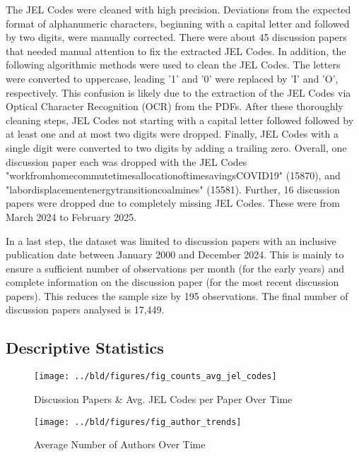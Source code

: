 \documentclass[11pt, a4paper, leqno]{article}
\begin{document}
The JEL Codes were cleaned with high precision.
Deviations from the expected format of alphanumeric characters, beginning with a capital letter and followed by two digits, were manually corrected.
There were about 45 discussion papers that needed manual attention to fix the extracted JEL Codes.
In addition, the following algorithmic methods were used to clean the JEL Codes.
The letters were converted to uppercase, leading '1' and '0' were replaced by 'I' and 'O', respectively.
This confusion is likely due to the extraction of the JEL Codes via Optical Character Recognition (OCR) from the PDFs.
After these thoroughly cleaning steps, JEL Codes not starting with a capital letter followed followed by at least one and at most two digits were dropped.
Finally, JEL Codes with a single digit were converted to two digits by adding a trailing zero.
Overall, one discussion paper each was dropped with the JEL Codes "workfromhomecommutetimesallocationoftimesavingsCOVID19" (15870), and
"labordisplacementenergytransitioncoalmines" (15581).
Further, 16 discussion papers were dropped due to completely missing JEL Codes. These were from March 2024 to February 2025.

In a last step, the dataset was limited to discussion papers with an inclusive publication date between January 2000 and December 2024.
This is mainly to ensure a sufficient number of observations per month (for the early years) and complete information on the discussion paper (for the most recent discussion papers).
This reduces the sample size by 195 observations. The final number of discussion papers analysed is 17,449.

\subsection{Descriptive Statistics}

\begin{figure}
    \centering
    \texttt{[image: ../bld/figures/fig\_counts\_avg\_jel\_codes]}
    \caption{Discussion Papers \& Avg. JEL Codes per Paper Over Time}
    \label{fig:monthly_counts_and_avg_jel_codes_per_paper}
\end{figure}

\begin{figure}
    \centering
    \texttt{[image: ../bld/figures/fig\_author\_trends]}
    \caption{Average Number of Authors Over Time}
    \label{fig:author_trends}
\end{figure}
\end{document}
